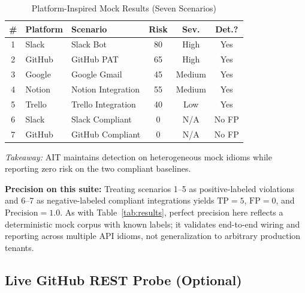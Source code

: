\documentclass[conference]{IEEEtran}
\begin{document}
\begin{table}[htbp]
  \caption{Platform-Inspired Mock Results (Seven Scenarios)}
  \label{tab:platform}
  \centering
  \renewcommand{\arraystretch}{1.2}
  \footnotesize
  \setlength{\tabcolsep}{3pt}
  \begin{tabular}{@{}cllccc@{}}
    \toprule
    \textbf{\#} & \textbf{Platform} & \textbf{Scenario} & \textbf{Risk} & \textbf{Sev.} & \textbf{Det.?} \\
    \midrule
    1 & Slack   & Slack Bot            & 80 & High    & Yes \\
    2 & GitHub  & GitHub PAT           & 65 & High    & Yes \\
    3 & Google  & Google Gmail         & 45 & Medium  & Yes \\
    4 & Notion  & Notion Integration   & 55 & Medium  & Yes \\
    5 & Trello  & Trello Integration   & 40 & Low     & Yes \\
    6 & Slack   & Slack Compliant      & 0  & N/A     & No FP \\
    7 & GitHub  & GitHub Compliant     & 0  & N/A     & No FP \\
    \bottomrule
  \end{tabular}
\end{table}

\noindent\textit{Takeaway:} AIT maintains detection on heterogeneous mock
idioms while reporting zero risk on the two compliant baselines.

\noindent\textbf{Precision on this suite:} Treating scenarios 1--5 as
positive-labeled violations and 6--7 as negative-labeled compliant
integrations yields $\mathrm{TP}{=}5$, $\mathrm{FP}{=}0$, and
$\mathrm{Precision}{=}1.0$. As with Table~\ref{tab:results}, perfect
precision here reflects a deterministic mock corpus with known labels;
it validates end-to-end wiring and reporting across multiple API
idioms, not generalization to arbitrary production tenants.

\subsection{Live GitHub REST Probe (Optional)}
\label{sec:livegithub}
\end{document}
